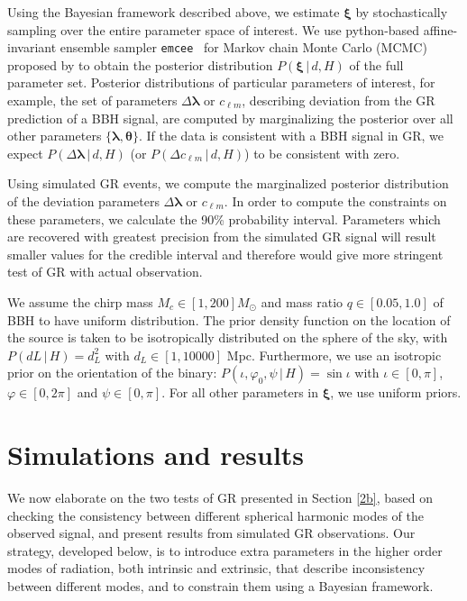 \documentclass[prd,preprintnumbers,twocolumn,eqsecnum,floatfix,a4paper,nofootinbib,superscriptaddress]{revtex4}
\newcommand{\blambda}{\bm{\lambda}}
\newcommand{\btheta}{\bm{\theta}}
\newcommand{\bxi}{\bm{\xi}}
\begin{document}
Using the Bayesian framework described above, we estimate $\bxi$ by stochastically sampling over the entire parameter space of interest. We use python-based affine-invariant ensemble sampler \texttt{emcee}~\cite{foreman2013emcee} for Markov chain Monte Carlo (MCMC) proposed by \cite{goodman2010ensemble} to obtain the posterior distribution $P(\bxi \, | \, d, H)$ of the full parameter set. Posterior distributions of particular parameters of interest, for example,  the set of parameters ${\Delta \blambda}$ or $c_{\ell m}$, describing deviation from the GR prediction of a BBH signal, are computed  by marginalizing the posterior over all other parameters $\{\blambda, \btheta\}$. If the data is consistent with a BBH signal in GR, we expect $P(\Delta \blambda \, | \, d, H)$ (or $P(\Delta c_{\ell m} \, | \, d, H)$) to be consistent with zero. 

Using simulated GR events, we compute the marginalized posterior distribution of the deviation parameters  ${\Delta \blambda}$ or $c_{\ell m}$. In order to compute the constraints on these parameters, we calculate the 90\% probability interval. Parameters which are recovered with greatest precision from the simulated GR signal will result smaller values for the credible interval and therefore would give more stringent test of GR with actual observation.

We assume the chirp mass $M_c \in [1,200] M_\odot$ and mass ratio $q \in [0.05,1.0]$ of BBH to have uniform distribution. The prior density function on the location of the source is  taken  to  be  isotropically  distributed  on  the  sphere of  the  sky,  with $P({dL} \, | \, H)=d_{L}^{2}$ with $d_L \in [1,10000]$ Mpc. Furthermore, we use an  isotropic  prior  on  the  orientation  of  the  binary: $P({\iota,\varphi_0,\psi} \, | \, H)=\sin\iota$ with $\iota \in [0,\pi]$, $\varphi \in [0,2\pi]$ and $\psi \in [0,\pi]$. For all other parameters in $\bxi$, we use uniform priors.


\section{Simulations and results}
\label{sec:simulations}

We now elaborate on the two tests of GR presented in Section \ref{2b}, based on checking the consistency between different spherical harmonic modes of the observed signal, and present results from simulated GR observations. Our strategy, developed below, is to introduce extra parameters in the higher order modes of radiation, both intrinsic and extrinsic, that describe inconsistency between different modes, and to constrain them using a Bayesian framework. 
\end{document}
